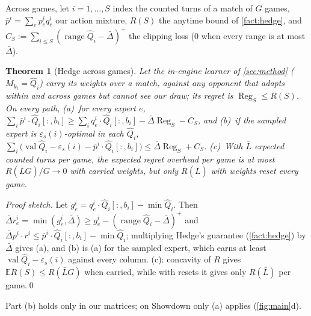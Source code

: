 \documentclass[10pt]{article}
\theoremstyle{tplain}
\newtheorem{theorem}{Theorem}
\theoremstyle{tdef}
\theoremstyle{trem}
\newcommand{\E}{\mathbb{E}}
\newcommand{\epss}{\varepsilon_s}
\newcommand{\Qhat}{\hat Q}
\DeclareMathOperator{\val}{val}
\DeclareMathOperator{\Reg}{Reg}
\begin{document}
Across games, let $i=1,\dots,S$ index the counted turns of a match of $G$ games, $\bar p^i=\sum_ep^i_eq^i_e$ our action mixture, $R(S)$ the anytime bound of \cref{fact:hedge}, and $C_S:=\sum_{i\le S}(\operatorname{range}\Qhat_i-\bar\Delta)^+$ the clipping loss ($0$ when every range is at most $\bar\Delta$).
\begin{theorem}[Hedge across games]\label{thm:hedge}
Let the in-engine learner of \cref{sec:method} ($M_{k_i}=\Qhat_i$) carry its weights over a match, against any opponent that adapts within and across games but cannot see our draw; its regret is $\Reg_S\le R(S)$. On every path, (a)~for every expert $e$, $\sum_i\bar p^i\cdot\Qhat_i[:,b_i]\ge\sum_iq^i_e\cdot\Qhat_i[:,b_i]-\bar\Delta\Reg_S-C_S$, and (b)~if the sampled expert is $\epss(i)$-optimal in each $\Qhat_i$, $\sum_i\big(\val\Qhat_i-\epss(i)-\bar p^i\cdot\Qhat_i[:,b_i]\big)\le\bar\Delta\Reg_S+C_S$. (c)~With $\bar L$ expected counted turns per game, the expected regret overhead per game is at most $R(\bar LG)/G\to0$ with carried weights, but only $R(\bar L)$ with weights reset every game.
\end{theorem}
\emph{Proof sketch.} Let $g^i_e=q^i_e\cdot\Qhat_i[:,b_i]-\min\Qhat_i$. Then $\bar\Delta r^i_e=\min(g^i_e,\bar\Delta)\ge g^i_e-(\operatorname{range}\Qhat_i-\bar\Delta)^+$ and $\bar\Delta p^i\cdot r^i\le\bar p^i\cdot\Qhat_i[:,b_i]-\min\Qhat_i$; multiplying Hedge's guarantee (\cref{fact:hedge}) by $\bar\Delta$ gives (a), and (b) is (a) for the sampled expert, which earns at least $\val\Qhat_i-\epss(i)$ against every column. (c): concavity of $R$ gives $\E R(S)\le R(\bar LG)$ when carried, while with resets it gives only $R(\bar L)$ per game.\qed

Part (b) holds only in our matrices; on Showdown only (a) applies (\cref{fig:main}d).
\end{document}
